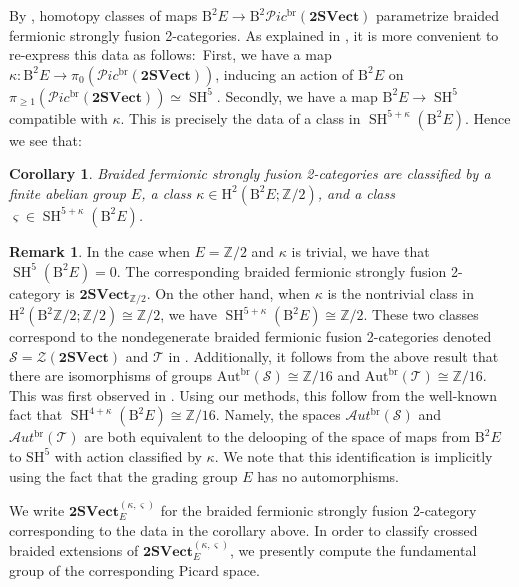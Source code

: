 \documentclass[11pt,reqno]{amsart}
\DeclareMathOperator{\br}{br}
\newcommand{\Z}{\mathbb{Z}}
\DeclareMathOperator{\SH}{SH}
\newcommand{\tSVect}{\mathbf{2SVect}}
\newcommand{\sPic}{\mathscr{P}ic}
\newcommand{\sAut}{\mathscr{A}ut}
\newcommand{\rH}{\mathrm{H}}
\newcommand{\rB}{\mathrm{B}}
\numberwithin{equation}{section}
\theoremstyle{plain}
\newtheorem{cor}[equation]{Corollary}
\theoremstyle{definition}
\newtheorem{rem}[equation]{Remark}
\begin{document}
By , homotopy classes of maps $\rB^2E \rightarrow \rB^2 \sPic^{\br}(\tSVect)$ parametrize braided fermionic strongly fusion 2-categories. As explained in \cite[Section 4.2]{D11}, it is more convenient to re-express this data as follows:\ First, we have a map $\kappa:\rB^2 E \rightarrow \pi_0(\sPic^{\br}(\tSVect))$, inducing an action of $\rB^2 E$ on $\pi_{\geq 1}(\sPic^{\br}(\tSVect))\simeq \SH^5$. Secondly, we have a map $\rB^2 E \rightarrow \SH^5$ compatible with $\kappa$. This is precisely the data of a class in $\SH^{5+\kappa}(\rB^2 E)$. Hence we see that:

\begin{cor}\label{cor:BFSF2C}
Braided fermionic strongly fusion 2-categories are  classified by a finite abelian group $E$, a class $\kappa \in \rH^2(\rB^2 E;\Z/2)$, and a class $\varsigma  \in \SH^{5+\kappa}(\rB^2 E)$.
\end{cor}

\begin{rem}\label{rem:SandT}
In the case when $E = \Z/2$ and $\kappa$ is trivial, we have that $\SH^{5}(\rB^2 E) = 0$. The corresponding braided fermionic strongly fusion 2-category is $\mathbf{2SVect}_{\mathbb{Z}/2}$.
On the other hand, when $\kappa$ is the nontrivial class in $\rH^2(\rB^2 \mathbb{Z}/2;\Z/2)\cong\mathbb{Z}/2$, we have $\SH^{5+\kappa}(\rB^2 E)\cong\mathbb{Z}/2$. These two classes correspond to the nondegenerate braided fermionic fusion 2-categories denoted $\mathcal S = \mathcal{Z}(\mathbf{2SVect})$ and $\mathcal T$ in \cite{JF2,JFR}. Additionally, it follows from the above result that there are isomorphisms of groups $\mathrm{Aut}^{\br}(\mathcal{S})\cong\mathbb{Z}/16$ and $\mathrm{Aut}^{\br}(\mathcal{T})\cong\mathbb{Z}/16$. This was first observed in \cite[Equation 19]{JF2}.
Using our methods, this follow from the well-known fact that $\SH^{4+\kappa}(\rB^2 E)\cong\mathbb{Z}/16$.
Namely, the spaces $\sAut^{\br}(\mathcal{S})$ and $\sAut^{\br}(\mathcal{T})$ are both equivalent to the delooping of the space of maps from $\mathrm{B}^2E$ to $\mathrm{SH}^5$ with action classified by $\kappa$. We note that this identification is implicitly using the fact that the grading group $E$ has no automorphisms.
\end{rem}

We write $\tSVect^{(\kappa,\varsigma)}_{E}$ for the braided fermionic strongly fusion 2-category corresponding to the data in the corollary above.
In order to classify crossed braided extensions of $\tSVect^{(\kappa,\varsigma)}_{E}$, we presently compute the fundamental group of the corresponding Picard space.
\end{document}
